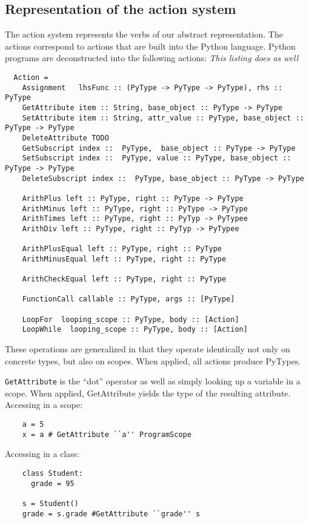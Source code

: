 \documentclass{article}[12pt]
\begin{document}
\subsection{Representation of the action system}
The action system represents the verbs of our abstract representation. The actions correspond to
actions that are built into the Python language. Python programs are
deconstructed into the following actions:
\emph{This listing does as well}
\begin{verbatim}
  Action =
    Assignment   lhsFunc :: (PyType -> PyType -> PyType), rhs :: PyType
    GetAttribute item :: String, base_object :: PyType -> PyType
    SetAttribute item :: String, attr_value :: PyType, base_object :: PyType -> PyType
    DeleteAttribute TODO
    GetSubscript index ::  PyType,  base_object :: PyType -> PyType
    SetSubscript index ::  PyType, value :: PyType, base_object :: PyType -> PyType
    DeleteSubscript index ::  PyType, base_object :: PyType -> PyType

    ArithPlus left :: PyType, right :: PyType -> PyType
    ArithMinus left :: PyType, right :: PyType -> PyType  
    ArithTimes left :: PyType, right :: PyTyp -> PyTypee
    ArithDiv left :: PyType, right :: PyTyp -> PyTypee

    ArithPlusEqual left :: PyType, right :: PyType
    ArithMinusEqual left :: PyType, right :: PyType

    ArithCheckEqual left :: PyType, right :: PyType

    FunctionCall callable :: PyType, args :: [PyType]

    LoopFor  looping_scope :: PyType, body :: [Action]
    LoopWhile  looping_scope :: PyType, body :: [Action]
\end{verbatim}


These operations are generalized in that they operate identically not only on concrete types, but
also on scopes. When applied, all actions produce PyTypes.

\verb=GetAttribute= is the ``dot'' operator as well as simply looking up a variable in a scope. When
applied, GetAttribute yields the type of the resulting attribute.
Accessing in a scope:
\begin{verbatim}
    a = 5
    x = a # GetAttribute ``a'' ProgramScope
\end{verbatim}

Accessing in a class:
\begin{verbatim}
    class Student:
      grade = 95

    s = Student()
    grade = s.grade #GetAttribute ``grade'' s
\end{verbatim}
\end{document}
